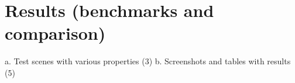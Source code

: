 
\chapter{Results (benchmarks and comparison)}
\label{ch:results}

a.	Test scenes with various properties (3)
b.	Screenshots and tables with results (5)
